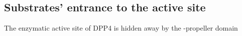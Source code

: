 \subsection{Substrates' entrance to the active site}

The enzymatic active site of DPP4 is hidden away by the \beta-propeller domain